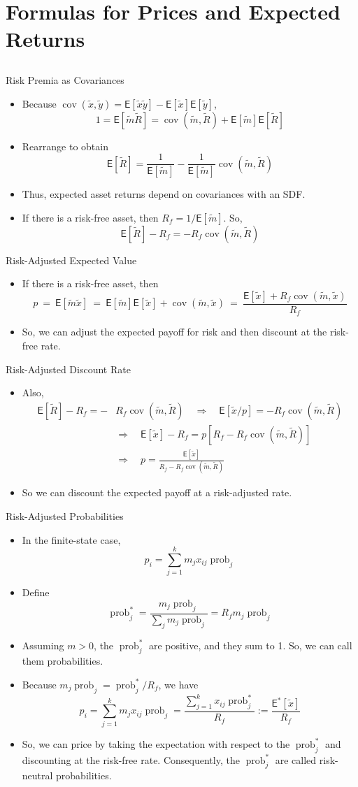 \documentclass[10pt]{beamer}
\DeclareMathOperator{\cov}{cov}
\DeclareMathOperator{\prob}{prob}
\newcommand{\bi}{\begin{itemize}}
\newcommand{\ei}{\end{itemize}}
\newcommand{\im}{\item}
\newcommand{\mye}{\ensuremath{\mathsf{E}}}
\newcommand{\tx}{\tilde{x}}
\newcommand{\ty}{\tilde{y}}
\newcommand{\tm}{\tilde{m}}
\newcommand{\tr}{\widetilde{R}}
\newcommand{\tr}{\widetilde{\mathbf{R}}}
\begin{document}
\section{Formulas for Prices and Expected Returns}
\subsection{}


\begin{frame}{Risk Premia as Covariances}
\bi 
\im Because $\cov(\tx,\ty) = \mye[\tx\ty] - \mye[\tx]\mye[\ty]$,
$$1 = \mye[\tm\tr] = \cov(\tm,\tr) + \mye[\tm]\mye[\tr]$$
\im Rearrange to obtain
$$\mye[\tr] = \frac{1}{\mye[\tm]} - \frac{1}{\mye[\tm]}\cov(\tm,\tr)$$
\im Thus, expected asset returns depend on covariances with an SDF.
\im If there is a risk-free asset, then $R_f = 1/\mye[\tm]$.  So,
$$\mye[\tr]-R_f = - R_f\cov(\tm,\tr)$$
\ei
\end{frame}

\begin{frame}{Risk-Adjusted Expected Value}
\bi 
\im 
If there is a risk-free asset, then
$$p \ = \ \mye[\tilde{m}\tilde{x}]  \ = \ \mye[\tilde{m}]\mye[\tilde{x}]+ \cov(\tilde{m},\tilde{x})
\ = \ \frac{\mye[\tilde{x}] + R_f\cov(\tilde{m},\tilde{x})}{R_f}$$
\im So, we can adjust the expected payoff for risk and then discount at the risk-free rate.
\ei 
\end{frame}

\begin{frame}{Risk-Adjusted Discount Rate}
    \bi 
    \im
Also,
\begin{align*}
    \mye[\tr]-R_f = - & R_f\cov(\tm,\tr)\quad 
    \Rightarrow \quad     \mye[\tx/p] = - R_f\cov(\tm,\tr) \\
    &\Rightarrow \quad \mye[\tx]-R_f =p\left[R_f- R_f\cov(\tm,\tr)\right] \\  
     &\Rightarrow \quad p= \frac{\mye[\tilde{x}]}{R_f - R_f\cov(\tilde{m},\tilde{R})}
\end{align*}
\im So we can discount the expected payoff at a risk-adjusted rate. 
\ei 
\end{frame}

\begin{frame}{Risk-Adjusted Probabilities}
\bi 
\im In the finite-state case,
$$p_i = \sum_{j=1}^k m_j x_{ij}\prob_j$$
\im Define
$$\prob^*_j =  \frac{m_j\prob_j}{\sum_j m_j \prob_j} = R_f m_j \prob_j$$
\im Assuming $m>0$, the $\prob^*_j$ are positive, and they sum to 1.  So, we can call them probabilities.
\im Because $m_j\prob_j = \prob^*_j/R_f$, we have
$$p_i = \sum_{j=1}^k m_j x_{ij}\prob_j = \frac{\sum_{j=1}^k x_{ij}\prob^*_j}{R_f} := \frac{\mye^*[\tx]}{R_f}$$
\im So, we can price by taking the expectation with respect to the $\prob^*_j$ and discounting at the risk-free rate.  Consequently, the $\prob^*_j$ are called \alert{risk-neutral probabilities}.
\ei
\end{frame}
\end{document}

